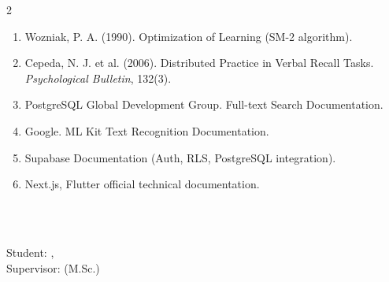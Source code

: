 \begin{multicols}{2}
\small
\begin{enumerate}
    \item Wozniak, P. A. (1990). Optimization of Learning (SM-2 algorithm).
    \item Cepeda, N. J. et al. (2006). Distributed Practice in Verbal Recall Tasks. \textit{Psychological Bulletin}, 132(3).
    \item PostgreSQL Global Development Group. Full-text Search Documentation.
    \item Google. ML Kit Text Recognition Documentation.
    \item Supabase Documentation (Auth, RLS, PostgreSQL integration).
    \item Next.js, Flutter official technical documentation.
\end{enumerate}
\normalsize

\end{multicols}

\newpage

\thispagestyle{plain}

\vspace*{-6mm}
\begin{center}
\textbf{\large \titlename}\\[1mm]
\end{center}

\begin{flushright}
\departmentname\\
Student: \studentID, \authorShort\\
Supervisor: \supervisorname (M.Sc.)
\end{flushright}

